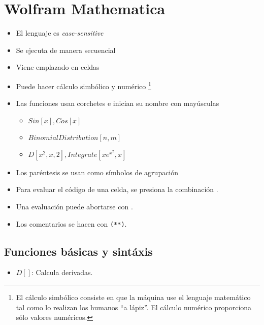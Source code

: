\chapter{Wolfram Mathematica}

\begin{itemize}
	\item{El lenguaje es \textit{case-sensitive}}
	\item{Se ejecuta de manera secuencial}
	\item{Viene emplazado en celdas}
	\item{Puede hacer cálculo simbólico y numérico \footnote{El cálculo
		simbólico consiste en que la máquina use el lenguaje matemático
tal como lo realizan los humanos ``a lápiz''. El cálculo numérico proporciona
sólo valores numéricos.}}
	\item Las funciones usan corchetes e inician su nombre con mayúsculas
		\begin{itemize}
			\item $Sin[x], Cos[x]$
			\item $BinomialDistribution[n, m]$
			\item $D[x^2,{x,2}], Integrate[xe^{x^2}, x]$
		\end{itemize}
	\item Los paréntesis se usan como símbolos de agrupación
	\item Para evaluar el código de una celda, se presiona la combinación
		.
	\item Una evaluación puede abortarse con .
	\item Los comentarios se hacen con \texttt{(**)}.
\end{itemize}

\section{Funciones básicas y sintáxis}

\begin{itemize}
	\item $D[ ]$: Calcula derivadas.
\end{itemize}
